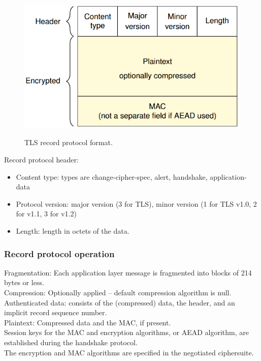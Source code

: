 \documentclass{article}
\begin{document}
\noindent\begin{minipage}{0.54\textwidth}%
\begin{figure}[H]
\begin{center}
\includegraphics[scale=0.55]{Images/tlsrecordprotocolformat.png}
\label{fig:fround}
\caption{TLS record protocol format.}
\end{center}
\end{figure}
\end{minipage}%
\hfill%
\begin{minipage}{0.42\textwidth}
Record protocol header:
\begin{itemize}
    \item Content type: types are change-cipher-spec, alert, handshake, application-data
    \item Protocol version: major version (3 for TLS), minor version (1 for TLS v1.0, 2 for v1.1, 3 for v1.2)
    \item Length: length in octets of the data.
\end{itemize}
\end{minipage}

\subsubsection{Record protocol operation}

Fragmentation: Each application layer message is fragmented into blocks of 214 bytes or less.\\
Compression: Optionally applied – default compression algorithm is null.\\
Authenticated data: consists of the (compressed) data, the header, and an implicit record sequence number.\\
Plaintext: Compressed data and the MAC, if present.\\
Session keys for the MAC and encryption algorithms, or AEAD algorithm, are established during the handshake protocol.\\
The encryption and MAC algorithms are specified in the negotiated ciphersuite.
\end{document}
